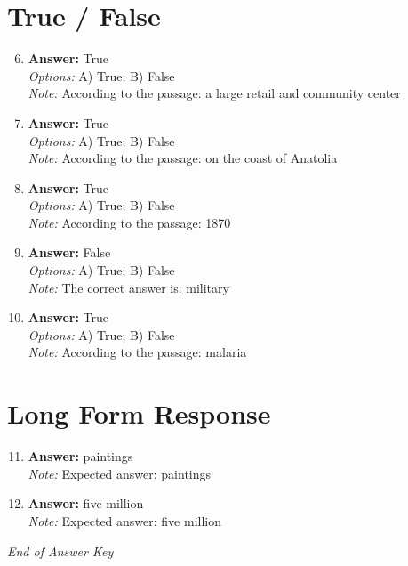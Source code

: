 \documentclass[12pt]{article}
\begin{document}
\section*{True / False}
\begin{enumerate}[label=\arabic*.]
\setcounter{enumi}{5}
\item \textbf{Answer:} True
\\ \textit{Options:} A) True; B) False
\\ \textit{Note:} According to the passage: a large retail and community center
\item \textbf{Answer:} True
\\ \textit{Options:} A) True; B) False
\\ \textit{Note:} According to the passage: on the coast of Anatolia
\item \textbf{Answer:} True
\\ \textit{Options:} A) True; B) False
\\ \textit{Note:} According to the passage: 1870
\item \textbf{Answer:} False
\\ \textit{Options:} A) True; B) False
\\ \textit{Note:} The correct answer is: military
\item \textbf{Answer:} True
\\ \textit{Options:} A) True; B) False
\\ \textit{Note:} According to the passage: malaria
\end{enumerate}

\section*{Long Form Response}
\begin{enumerate}[label=\arabic*.]
\setcounter{enumi}{10}
\item \textbf{Answer:} paintings
\\ \textit{Note:} Expected answer: paintings
\item \textbf{Answer:} five million
\\ \textit{Note:} Expected answer: five million
\end{enumerate}

\vfill
\noindent\textit{End of Answer Key}
\end{document}
